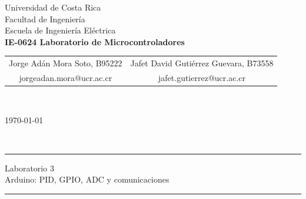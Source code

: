 \thispagestyle{empty}
\begin{center}
    \LARGE{\sc Universidad de Costa Rica}\\[-1mm]\Large{Facultad de Ingeniería}\\[-1mm]\Large{Escuela de Ingeniería} Eléctrica\\[2mm]\large{\textbf{IE-0624 Laboratorio de Microcontroladores}}
    \\[-0.10mm]
\begin{table}[H]
\centering
\begin{tabular}{cc}
Jorge Adán Mora Soto, B95222 & Jafet David Gutiérrez Guevara, B73558 \\
 \textcolor{ucrblue}{ \small{jorgeadan.mora@ucr.ac.cr}}    &  \textcolor{ucrblue}{ \small{jafet.gutierrez@ucr.ac.cr}}
\end{tabular}
\\[-6mm]
\end{table}
\large{\today}
\end{center}


\\[-1.5cm]
\hrule
\begin{center}
\Large{Laboratorio 3}\\ \large{Arduino: PID, GPIO, ADC y comunicaciones}
\\[4mm]
\end{center}
\hrule
\vspace{8mm}